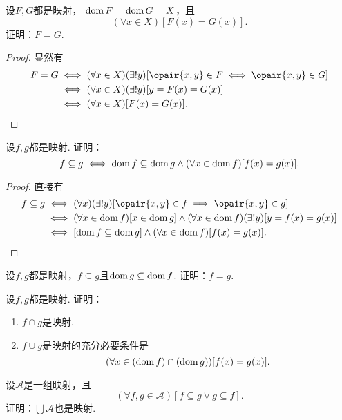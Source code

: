 \begin{example}
设\(F,G\)都是映射，
\(\operatorname{dom} F = \operatorname{dom} G = X\)，且\[
	(\forall x \in X)[F(x) = G(x)].
\]
证明：\(F=G\).
\begin{proof}
显然有
\begin{align*}
	F=G
	&\iff (\forall x \in X)(\exists!y)[
		\opair{x,y} \in F
		\iff
		\opair{x,y} \in G
	] \\
	&\iff (\forall x \in X)(\exists!y)[
		y = F(x) = G(x)
	] \\
	&\iff (\forall x \in X)[F(x) = G(x)].
	\qedhere
\end{align*}
\end{proof}
\end{example}

\begin{example}
设\(f,g\)都是映射.
证明：\[
	f \subseteq g
	\iff
	\operatorname{dom} f \subseteq \operatorname{dom} g
	\land
	(\forall x \in \operatorname{dom} f)
	[f(x) = g(x)].
\]
\begin{proof}
直接有
\begin{align*}
	f \subseteq g
	&\iff (\forall x)(\exists!y)[\opair{x,y} \in f \implies \opair{x,y} \in g] \\
	&\iff (\forall x \in \dom f)[x \in \dom g]\land(\forall x \in \dom f)(\exists!y)[y=f(x)=g(x)] \\
	&\iff [\dom f \subseteq \dom g]\land(\forall x \in \dom f)[f(x)=g(x)].
	\qedhere
\end{align*}
\end{proof}
\end{example}

\begin{example}
设\(f,g\)都是映射，\(f \subseteq g\)且\(\operatorname{dom} g \subseteq \operatorname{dom} f\).
证明：\(f=g\).
\end{example}

\begin{example}
设\(f,g\)都是映射.
证明：
\begin{enumerate}
	\item \(f \cap g\)是映射.
	\item \(f \cup g\)是映射的充分必要条件是\[
		(\forall x \in (\operatorname{dom} f)\cap(\operatorname{dom} g))[f(x)=g(x)].
	\]
\end{enumerate}
\end{example}

\begin{example}
\def\A{\mathscr{A}}%
设\(\A\)是一组映射，且\[
	(\forall f,g\in\A)[f \subseteq g \lor g \subseteq f].
\]
证明：\(\bigcup\A\)也是映射.
\end{example}

